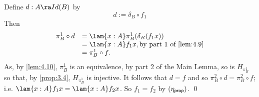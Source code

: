 Define $d:A\ra Id(B)$ by
  \[ d:=\delta_B\circ f_1\]
Then
  \[\begin{array}{ll}
\pi^1_B\circ d &=\lam{x:A} \pi^1_B(\delta_B(f_1x))\\
              &=\lam{x:A} f_1x, \mbox{by part 1 of \autoref{lem:4.9}}\\
              &=\pi^1_B\circ f.
  \end{array}\]
As, by \autoref{lem:4.10},
 $\pi^1_B$ is an equivalence, by part 2 of the Main Lemma, so is $H_{\pi^1_B}$ so that, by \autoref{prop:3.4},
$H_{\pi^1_B}$ is injective.  It follows that  $d=f$ and so 
$\pi^2_B\circ d =\pi^2_B\circ f$; i.e. $\lam{x:A} f_1x =\lam{x:A} f_2x$.
So $f_1=f_2$ by $(\eta_{\sf prop})$.
\qed



